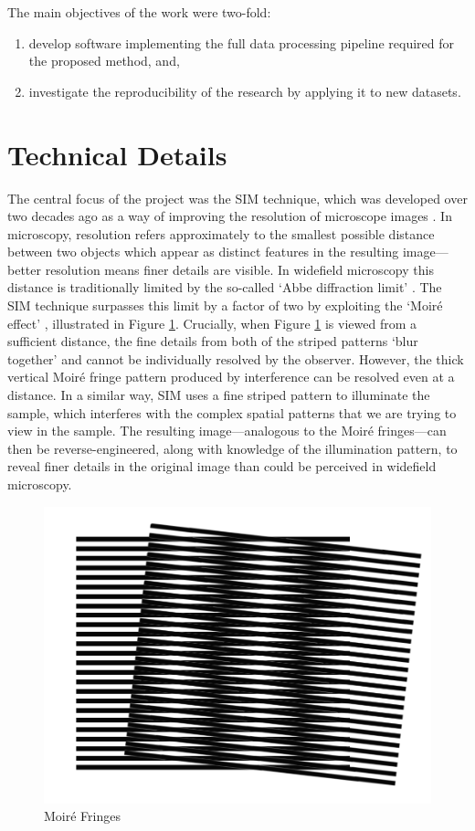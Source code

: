 \documentclass[12pt]{article}
\begin{document}
The main objectives of the work were two-fold:
\begin{enumerate}
    \item develop software implementing the full data processing pipeline required for the proposed method, and,
    \item investigate the reproducibility of the research by applying it to new datasets.
\end{enumerate}

\section*{Technical Details}

The central focus of the project was the SIM technique, which was developed over two decades ago
as a way of improving the resolution of microscope images \cite{SIM2000}.
In microscopy, resolution refers approximately to the smallest possible distance between two objects which appear as distinct features in the resulting image---better resolution means finer details are visible.
In widefield microscopy this distance is traditionally limited by the so-called `Abbe diffraction limit' \cite{abbe}.
The SIM technique surpasses this limit by a factor of two by exploiting the `Moir\'e effect' \cite{SIM2000},
illustrated in Figure \ref{fig:moire}.
Crucially, when Figure \ref{fig:moire} is viewed from a sufficient distance,
the fine details from both of the striped patterns `blur together' and cannot be individually resolved by the observer.
However, the thick vertical Moir\'e fringe pattern produced by interference can be resolved even at a distance.
In a similar way, SIM uses a fine striped pattern to illuminate the sample,
which interferes with the complex spatial patterns that we are trying to view in the sample.
The resulting image---analogous to the Moir\'e fringes---can then be reverse-engineered,
along with knowledge of the illumination pattern,
to reveal finer details in the original image than could be perceived in widefield microscopy.

\begin{figure}[hbtp]
    \includegraphics[scale=0.3, center]{moire.png}
    \caption{Moir\'{e} Fringes}
    \label{fig:moire}
\end{figure}
\end{document}
